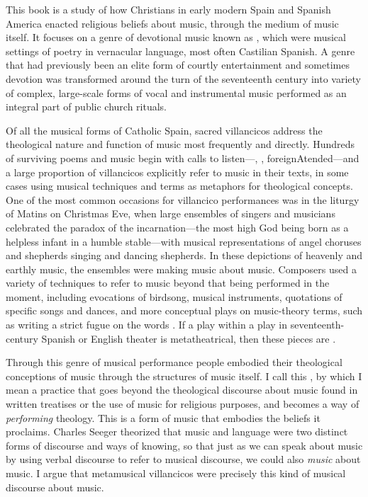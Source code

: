 This book is a study of how Christians in early modern Spain and Spanish
America enacted religious beliefs about music, through the medium of music
itself.
It focuses on a genre of devotional music known as , which
were musical settings of poetry in vernacular language, most often Castilian
Spanish.
A genre that had previously been an elite form of courtly entertainment and
sometimes devotion was transformed around the turn of the seventeenth century
into variety of complex, large-scale forms of vocal and instrumental music
performed as an integral part of public church rituals.%
    \Autocites
    [See overview and bibliography in][]{Cashner:WLSCM32}
    {Laird:VC}
    {Knighton-Torrente:VCs}
    {Torrente:VC-chapter}
    {CaberoPueyo:PhD}
    {Cashner:PhD}
    {Swadley:VillancicoPhD}
    {ChavezBarcenas:PhD}

Of all the musical forms of Catholic Spain, sacred villancicos address the
theological nature and function of music most frequently and directly.
Hundreds of surviving poems and music begin with calls to
listen---, , foreign{Atended}---and a large
proportion of villancicos explicitly refer to music in their texts, in some
cases using musical techniques and terms as metaphors for theological concepts.
One of the most common occasions for villancico performances was in the liturgy
of Matins on Christmas Eve, when large ensembles of singers and musicians
celebrated the paradox of the incarnation---the most high God being born
as a helpless infant in a humble stable---with musical representations of
angel choruses and shepherds singing and dancing shepherds.
In these depictions of heavenly and earthly music, the ensembles were making
music about music.
Composers used a variety of techniques to refer to music beyond that being
performed in the moment, including evocations of birdsong, musical instruments,
quotations of specific songs and dances, and more conceptual plays on
music-theory terms, such as writing a strict fugue on the words
.
If a play within a play in seventeenth-century Spanish or English theater is
metatheatrical, then these pieces are .

Through this genre of musical performance people embodied their theological
conceptions of music through the structures of music itself.
I call this , by which I mean a practice that goes
beyond the theological discourse about music found in written treatises or the
use of music for religious purposes, and becomes a way of \emph{performing}
theology.
This is a form of music that embodies the beliefs it proclaims.
Charles Seeger theorized that music and language were two distinct forms of
discourse and ways of knowing, so that just as we can speak about music by
using verbal discourse to refer to musical discourse, we could also
\emph{music} about music.%
    \Autocites
    {Seeger:Unitary}
    {Small:Musicking}
I argue that metamusical villancicos were precisely this kind of musical
discourse about music.

